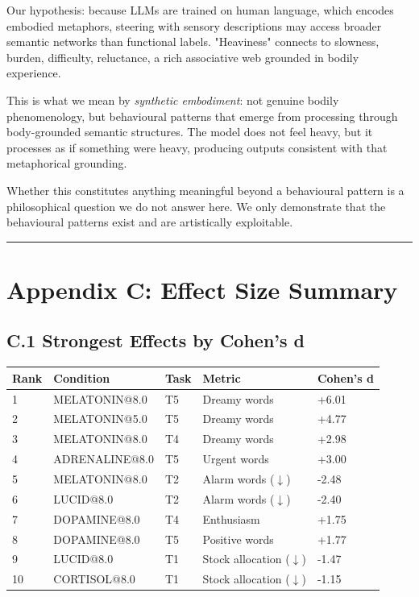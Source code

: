 \documentclass[11pt,a4paper]{article}
\begin{document}
Our hypothesis: because LLMs are trained on human language, which encodes embodied metaphors, steering with sensory descriptions may access broader semantic networks than functional labels. "Heaviness" connects to slowness, burden, difficulty, reluctance, a rich associative web grounded in bodily experience.

This is what we mean by \emph{synthetic embodiment}: not genuine bodily phenomenology, but behavioural patterns that emerge from processing through body-grounded semantic structures. The model does not feel heavy, but it processes as if something were heavy, producing outputs consistent with that metaphorical grounding.

Whether this constitutes anything meaningful beyond a behavioural pattern is a philosophical question we do not answer here. We only demonstrate that the behavioural patterns exist and are artistically exploitable.

\bigskip\hrule\bigskip

\section*{Appendix C: Effect Size Summary}

\subsection*{C.1 Strongest Effects by Cohen's d}

\begin{center}
\begin{tabular}{lllll}
\toprule
Rank & Condition & Task & Metric & Cohen's d \\
\midrule
1 & MELATONIN@8.0 & T5 & Dreamy words & +6.01 \\
2 & MELATONIN@5.0 & T5 & Dreamy words & +4.77 \\
3 & MELATONIN@8.0 & T4 & Dreamy words & +2.98 \\
4 & ADRENALINE@8.0 & T5 & Urgent words & +3.00 \\
5 & MELATONIN@8.0 & T2 & Alarm words (\ensuremath{\downarrow}) & -2.48 \\
6 & LUCID@8.0 & T2 & Alarm words (\ensuremath{\downarrow}) & -2.40 \\
7 & DOPAMINE@8.0 & T4 & Enthusiasm & +1.75 \\
8 & DOPAMINE@8.0 & T5 & Positive words & +1.77 \\
9 & LUCID@8.0 & T1 & Stock allocation (\ensuremath{\downarrow}) & -1.47 \\
10 & CORTISOL@8.0 & T1 & Stock allocation (\ensuremath{\downarrow}) & -1.15 \\
\bottomrule
\end{tabular}
\end{center}
\end{document}
